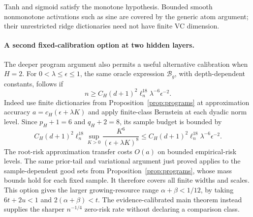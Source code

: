 Tanh and sigmoid satisfy the monotone hypothesis. Bounded smooth nonmonotone activations such as sine are covered by the generic atom argument; their unrestricted ridge dictionaries need not have finite VC dimension.

\paragraph{A second fixed-calibration option at two hidden layers.}
The deeper program argument also permits a useful alternative calibration when $H=2$. For $0<\lambda\le\epsilon\le1$, the same oracle expression $\mathcal B_g$, with depth-dependent constants, follows if
\[
 n\ge C_H(d+1)^2\ell_n^{18}\lambda^{-6}\epsilon^{-2}.
\]
Indeed use finite dictionaries from Proposition~\ref{prop:programs} at approximation accuracy $a=c_H(\epsilon+\lambda K)$ and apply finite-class Bernstein at each dyadic norm level. Since $p_H+1=6$ and $q_H+2=8$, its sample budget is bounded by
\[
 C_H(d+1)^2\ell_n^{18}\sup_{K>0}
 \frac{K^6}{(\epsilon+\lambda K)^8}
 \le C_H(d+1)^2\ell_n^{18}\lambda^{-6}\epsilon^{-2}.
\]
The root-risk approximation transfer costs $O(a)$ on bounded empirical-risk levels. The same prior-tail and variational argument just proved applies to the sample-dependent good sets from Proposition~\ref{prop:programs}, whose mass bounds hold for each fixed sample. It therefore covers all finite widths and scales. This option gives the larger growing-resource range $\alpha+\beta<1/12$, by taking $6t+2u<1$ and $2(\alpha+\beta)<t$. The evidence-calibrated main theorem instead supplies the sharper $n^{-1/4}$ zero-risk rate without declaring a comparison class.
